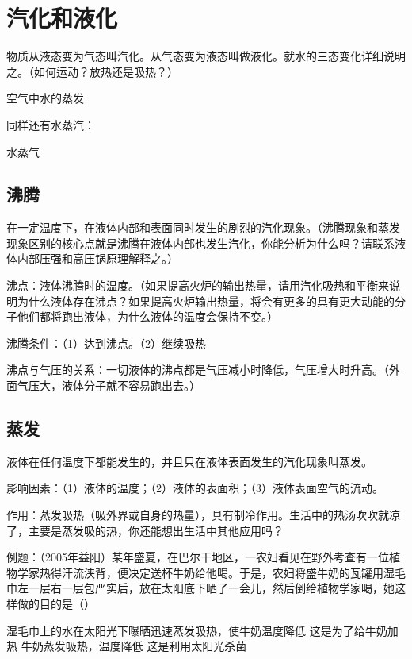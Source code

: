 \documentclass[12pt]{exam}
\begin{document}
\section{汽化和液化}
物质从液态变为气态叫汽化。从气态变为液态叫做液化。就水的三态变化详细说明之。（如何运动？放热还是吸热？）

\begin{fig}{空气中水的蒸发}
\end{fig}

同样还有水蒸汽：
\begin{fig}{水蒸气}
\end{fig}


\subsection{沸腾}
在一定温度下，在液体内部和表面同时发生的剧烈的汽化现象。（沸腾现象和蒸发现象区别的核心点就是沸腾在液体内部也发生汽化，你能分析为什么吗？请联系液体内部压强和高压锅原理解释之。）

沸点：液体沸腾时的温度。（如果提高火炉的输出热量，请用汽化吸热和平衡来说明为什么液体存在沸点？如果提高火炉输出热量，将会有更多的具有更大动能的分子他们都将跑出液体，为什么液体的温度会保持不变。）

沸腾条件：（1）达到沸点。（2）继续吸热 

沸点与气压的关系：一切液体的沸点都是气压减小时降低，气压增大时升高。（外面气压大，液体分子就不容易跑出去。）


\subsection{蒸发}
液体在任何温度下都能发生的，并且只在液体表面发生的汽化现象叫蒸发。


影响因素：（1）液体的温度；（2）液体的表面积；（3）液体表面空气的流动。

作用：蒸发吸热（吸外界或自身的热量），具有制冷作用。生活中的热汤吹吹就凉了，主要是蒸发吸的热，你还能想出生活中其他应用吗？


例题：（2005年益阳）某年盛夏，在巴尔干地区，一农妇看见在野外考查有一位植物学家热得汗流浃背，便决定送杯牛奶给他喝。于是，农妇将盛牛奶的瓦罐用湿毛巾左一层右一层包严实后，放在太阳底下晒了一会儿，然后倒给植物学家喝，她这样做的目的是（\answerline*[A]）
\begin{choices}
\choice 湿毛巾上的水在太阳光下曝晒迅速蒸发吸热，使牛奶温度降低
\choice 这是为了给牛奶加热
\choice 牛奶蒸发吸热，温度降低
\choice 这是利用太阳光杀菌
\end{choices}
\end{document}
